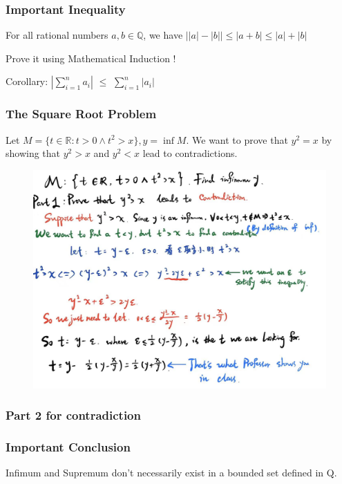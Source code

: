 \documentclass{beamer}
\begin{document}
\begin{frame}
    \frametitle{Important Inequality}
    For all rational numbers $a,b\in \mathbb{Q}$, we have
    $\left|\left|a\right|-\left|b\right|\right|\leq \left|a+b\right|\leq \left|a\right|+\left|b\right|$

    \vspace{2em}
    Prove it using Mathematical Induction !

    Corollary: $\left|\sum_{i=1}^n a_{i}\right|$ $\leq$ $\sum_{i=1}^n \left|a_{i}\right|$
\end{frame}

\begin{frame}
    \frametitle{The Square Root Problem}
    \hspace{1em}
    Let $M=\{t \in \mathbb{R} : t>0 \wedge t^2>x \}, y=\inf M.$
    We want to prove that $y^2=x$ by showing that $y^2 > x$ and $y^2<x$
    lead to contradictions.
    \begin{figure}[htbp]
        \centering
        \includegraphics[width=12cm]{squareProblem.jpg}
    \end{figure}
\end{frame}

\begin{frame}
    \frametitle{Part 2 for contradiction}
\end{frame}

\begin{frame}
    \frametitle{Important Conclusion}
    Infimum and Supremum don't necessarily exist in a bounded set defined in Q.
\end{frame}
\end{document}
